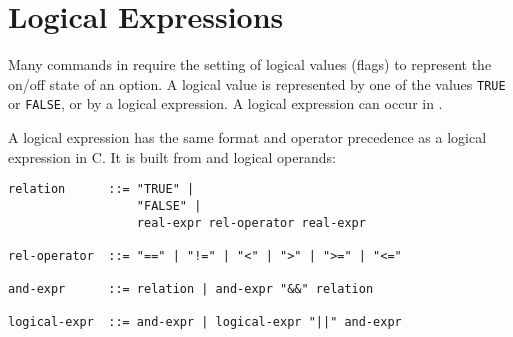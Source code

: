 \section{Logical Expressions}
\label{sec:alogical}
Many commands in \opal require the setting of logical values (flags)
to represent the on/off state of an option.
A logical value is represented by one of the values \texttt{TRUE} 
or \texttt{FALSE}, or by a logical expression.
A logical expression can occur in .
\par
A logical expression has the same format and operator precedence as a
logical expression in C. 
It is built from  and logical
operands: 
\begin{verbatim}
relation      ::= "TRUE" |
                  "FALSE" |
                  real-expr rel-operator real-expr

rel-operator  ::= "==" | "!=" | "<" | ">" | ">=" | "<="

and-expr      ::= relation | and-expr "&&" relation

logical-expr  ::= and-expr | logical-expr "||" and-expr
\end{verbatim}

